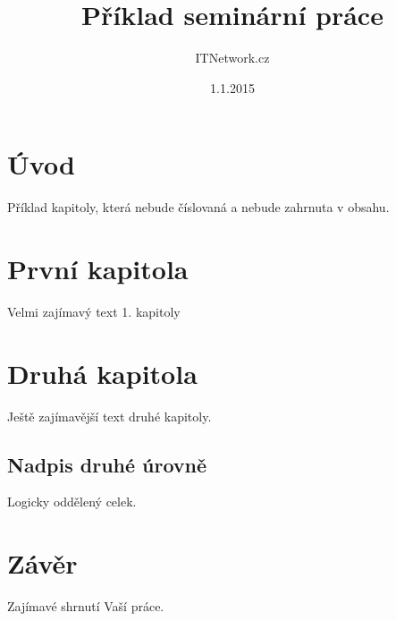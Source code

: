 \documentclass[12pt,a4paper,titlepage]{report}
\title{Příklad seminární práce}
\author{ITNetwork.cz}
\date{1.1.2015}
\begin{document}
    \maketitle

    \tableofcontents

    \chapter*{Úvod} 
        Příklad kapitoly, která nebude číslovaná a nebude zahrnuta v obsahu.

    \chapter{První kapitola}
        Velmi zajímavý text 1. kapitoly
    
    \chapter{Druhá kapitola}
        Ještě zajímavější text druhé kapitoly.
    
        \section{Nadpis druhé úrovně} 
            Logicky oddělený celek.
        
   \chapter*{Závěr}
       Zajímavé shrnutí Vaší práce.
\end{document}

